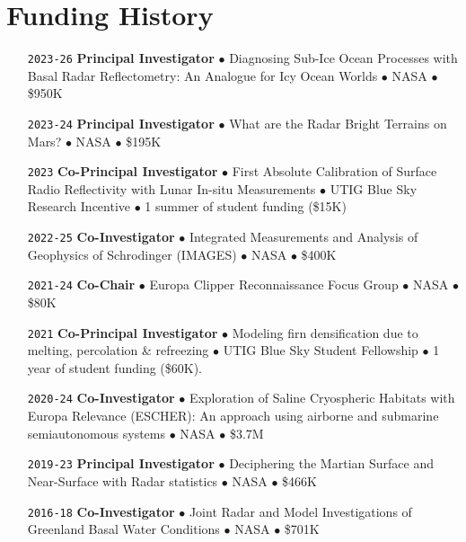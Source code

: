 \section*{Funding History}

\begin{itemize}[leftmargin=5.8em, labelsep=1.5em]
    \setlength\itemsep{-.3em}

    \item[\texttt{2023-26}] \textbf{Principal Investigator} $\bullet$ Diagnosing Sub-Ice Ocean Processes with Basal Radar Reflectometry: An Analogue for Icy Ocean Worlds $\bullet$ NASA $\bullet$ \$950K

    \item[\texttt{2023-24}] \textbf{Principal Investigator} $\bullet$ What are the Radar Bright Terrains on Mars? $\bullet$ NASA $\bullet$ \$195K
    
    \item[\texttt{2023}] \textbf{Co-Principal Investigator} $\bullet$ First Absolute Calibration of Surface Radio Reflectivity with Lunar In-situ Measurements $\bullet$ UTIG Blue Sky Research Incentive $\bullet$ 1 summer of student funding (\$15K)
    
    \item[\texttt{2022-25}] \textbf{Co-Investigator} $\bullet$ Integrated Measurements and Analysis of Geophysics of Schrodinger (IMAGES) $\bullet$ NASA $\bullet$ \$400K
    
    \item[\texttt{2021-24}] \textbf{Co-Chair} $\bullet$ Europa Clipper Reconnaissance Focus Group $\bullet$ NASA $\bullet$ \$80K
    
    \item[\texttt{2021}] \textbf{Co-Principal Investigator} $\bullet$ Modeling firn densification due to melting, percolation \& refreezing $\bullet$ UTIG Blue Sky Student Fellowship $\bullet$ 1 year of student funding (\$60K).
    
    \item[\texttt{2020-24}] \textbf{Co-Investigator} $\bullet$ Exploration of Saline Cryospheric Habitats with Europa Relevance (ESCHER): An approach using airborne and submarine semiautonomous systems $\bullet$ NASA $\bullet$ \$3.7M
    
    \item[\texttt{2019-23}] \textbf{Principal Investigator} $\bullet$ Deciphering the Martian Surface and Near-Surface with Radar statistics $\bullet$ NASA $\bullet$ \$466K
    
    \item[\texttt{2016-18}] \textbf{Co-Investigator} $\bullet$ Joint Radar and Model Investigations of Greenland Basal Water Conditions $\bullet$ NASA $\bullet$ \$701K
    

\end{itemize}
